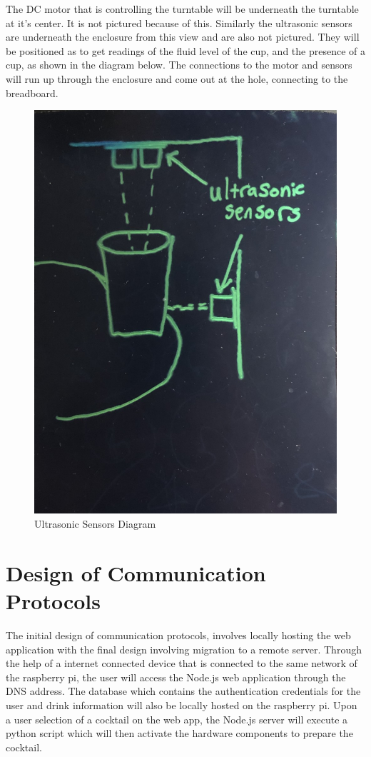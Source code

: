 \documentclass[12pt, titlepage]{article}
\begin{document}
The DC motor that is controlling the turntable will be underneath the turntable at it's center. It is not pictured because of this. Similarly the ultrasonic sensors are underneath the enclosure from this view and are also not pictured. They will be positioned as to get readings of the fluid level of the cup, and the presence of a cup, as shown in the diagram below. The connections to the motor and sensors will run up through the enclosure and come out at the hole, connecting to the breadboard.

    \begin{figure}[H]
    \centerline{\includegraphics[scale=.3]{Ultrasonic Sensors Diagram.jpg}}
    \caption{Ultrasonic Sensors Diagram}
    \label{fig}
    \end{figure}

\section{Design of Communication Protocols}
The initial design of communication protocols, involves locally hosting the web application with the final design involving migration to a remote server. Through the help of a internet connected device that is connected to the same network of the raspberry pi, the user will access the Node.js web application through the DNS address. The database which contains the authentication credentials for the user and drink information will also be locally hosted on the raspberry pi. Upon a user selection of a cocktail on the web app, the Node.js server will execute a python script which will then activate the hardware components to prepare the cocktail.
\end{document}
